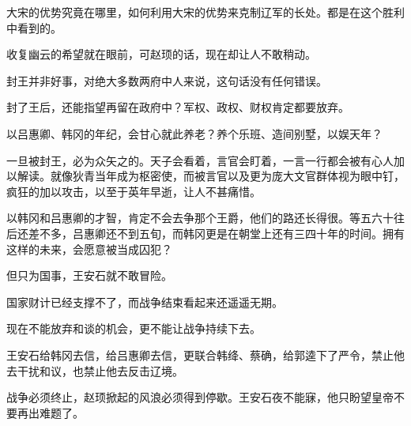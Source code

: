 大宋的优势究竟在哪里，如何利用大宋的优势来克制辽军的长处。都是在这个胜利中看到的。

收复幽云的希望就在眼前，可赵顼的话，现在却让人不敢稍动。

封王并非好事，对绝大多数两府中人来说，这句话没有任何错误。

封了王后，还能指望再留在政府中？军权、政权、财权肯定都要放弃。

以吕惠卿、韩冈的年纪，会甘心就此养老？养个乐班、造间别墅，以娱天年？

一旦被封王，必为众矢之的。天子会看着，言官会盯着，一言一行都会被有心人加以解读。就像狄青当年成为枢密使，而被言官以及更为庞大文官群体视为眼中钉，疯狂的加以攻击，以至于英年早逝，让人不甚痛惜。

以韩冈和吕惠卿的才智，肯定不会去争那个王爵，他们的路还长得很。等五六十往后还差不多，吕惠卿还不到五旬，而韩冈更是在朝堂上还有三四十年的时间。拥有这样的未来，会愿意被当成囚犯？

但只为国事，王安石就不敢冒险。

国家财计已经支撑不了，而战争结束看起来还遥遥无期。

现在不能放弃和谈的机会，更不能让战争持续下去。

王安石给韩冈去信，给吕惠卿去信，更联合韩绛、蔡确，给郭逵下了严令，禁止他去干扰和议，也禁止他去反击辽境。

战争必须终止，赵顼掀起的风浪必须得到停歇。王安石夜不能寐，他只盼望皇帝不要再出难题了。
